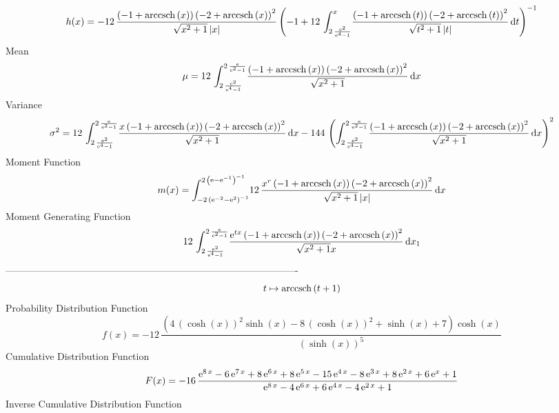 \documentclass[12pt]{article}
\begin{document}
 $$ h(x)=-12\,{\frac { \left( -1+{\rm arccsch} \left(x\right) \right)  \left( -
2+{\rm arccsch} \left(x\right) \right) ^{2}}{\sqrt {{x}^{2}+1} \left| 
x \right| } \left( -1+12\,\int_{2\,{\frac {{{\rm e}^{2}}}{{{\rm e}^{4}
}-1}}}^{x}\!{\frac { \left( -1+{\rm arccsch} \left(t\right) \right) 
 \left( -2+{\rm arccsch} \left(t\right) \right) ^{2}}{\sqrt {{t}^{2}+1
} \left| t \right| }}\,{\rm d}t \right) ^{-1}}
$$Mean 
 $$ \mu=12\,\int_{2\,{\frac {{{\rm e}^{2}}}{{{\rm e}^{4}}-1}}}^{2\,{\frac {{
\rm e}}{{{\rm e}^{2}}-1}}}\!{\frac { \left( -1+{\rm arccsch} \left(x
\right) \right)  \left( -2+{\rm arccsch} \left(x\right) \right) ^{2}}{
\sqrt {{x}^{2}+1}}}\,{\rm d}x
$$ Variance 
 $$ \sigma^2 = 12\,\int_{2\,{\frac {{{\rm e}^{2}}}{{{\rm e}^{4}}-1}}}^{2\,{\frac {{
\rm e}}{{{\rm e}^{2}}-1}}}\!{\frac {x \left( -1+{\rm arccsch} \left(x
\right) \right)  \left( -2+{\rm arccsch} \left(x\right) \right) ^{2}}{
\sqrt {{x}^{2}+1}}}\,{\rm d}x-144\, \left( \int_{2\,{\frac {{{\rm e}^{
2}}}{{{\rm e}^{4}}-1}}}^{2\,{\frac {{\rm e}}{{{\rm e}^{2}}-1}}}\!{
\frac { \left( -1+{\rm arccsch} \left(x\right) \right)  \left( -2+
{\rm arccsch} \left(x\right) \right) ^{2}}{\sqrt {{x}^{2}+1}}}
\,{\rm d}x \right) ^{2}
$$Moment Function 
 $$ m(x) = \int_{-2\, \left( {{\rm e}^{-2}}-{{\rm e}^{2}} \right) ^{-1}}^{2\,
 \left( {\rm e}-{{\rm e}^{-1}} \right) ^{-1}}\!12\,{\frac {{x}^{r}
 \left( -1+{\rm arccsch} \left(x\right) \right)  \left( -2+
{\rm arccsch} \left(x\right) \right) ^{2}}{\sqrt {{x}^{2}+1} \left| x
 \right| }}\,{\rm d}x
$$ Moment Generating Function 
 $$12\,\int_{2\,{\frac {{{\rm e}^{2}}}{{{\rm e}^{4}}-1}}}^{2\,{\frac {{
\rm e}}{{{\rm e}^{2}}-1}}}\!{\frac {{{\rm e}^{tx}} \left( -1+
{\rm arccsch} \left(x\right) \right)  \left( -2+{\rm arccsch} \left(x
\right) \right) ^{2}}{\sqrt {{x}^{2}+1}x}}\,{\rm d}x_{{1}}
$$-------------------------------------------------------------------------------------------  \\$$t\mapsto {\rm arccsch} \left(t+1\right)
$$Probability Distribution Function 
$$  f(x)=-12\,{\frac { \left( 4\, \left( \cosh \left( x \right)  \right) ^{2}
\sinh \left( x \right) -8\, \left( \cosh \left( x \right)  \right) ^{2
}+\sinh \left( x \right) +7 \right) \cosh \left( x \right) }{ \left( 
\sinh \left( x \right)  \right) ^{5}}}
$$Cumulative Distribution Function  
 $$F(x)=-16\,{\frac {{{\rm e}^{8\,x}}-6\,{{\rm e}^{7\,x}}+8\,{{\rm e}^{6\,x}}+
8\,{{\rm e}^{5\,x}}-15\,{{\rm e}^{4\,x}}-8\,{{\rm e}^{3\,x}}+8\,{
{\rm e}^{2\,x}}+6\,{{\rm e}^{x}}+1}{{{\rm e}^{8\,x}}-4\,{{\rm e}^{6\,x
}}+6\,{{\rm e}^{4\,x}}-4\,{{\rm e}^{2\,x}}+1}}
$$ Inverse Cumulative Distribution Function 
\end{document}
